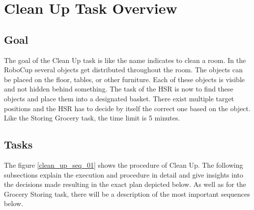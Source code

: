 \documentclass[main.tex]{subfiles}
\begin{document}
	\begingroup

	\renewcommand{\cleardoublepage}{}

	\renewcommand{\clearpage}{}

	\chapter{Clean Up Task Overview}
	\label{cleanup-sequence}

		
		\section{Goal}
		The goal of the Clean Up task is like the name indicates to clean a room. In the RoboCup several objects get distributed throughout the room. The objects can be placed on the floor, tables, or other furniture. Each of these objects is visible and not hidden behind something. The task of the HSR is now to find these objects and place them into a designated basket. There exist multiple target positions and the HSR has to decide by itself the correct one based on the object. Like the Storing Grocery task, the time limit is 5 minutes.

	  	\section{Tasks}
	  	The figure \ref{clean_up_seq_01} shows the procedure of Clean Up. The following subsections explain the execution and procedure in detail and give insights into the decisions made resulting in the exact plan depicted below. As well as for the Grocery Storing task, there will be a description of the most important sequences below.
\end{document}

